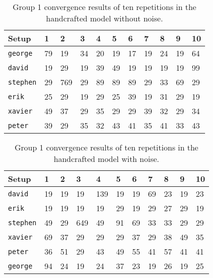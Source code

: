 \begin{table}
	\centering
	\begin{tabular}{lllllllllll}
		\hline
		\textbf{Setup} & \textbf{1} & \textbf{2} & \textbf{3} & \textbf{4} & \textbf{5} & \textbf{6} & \textbf{7} & \textbf{8} & \textbf{9} & \textbf{10} \\\hline
		\texttt{george} & 79 & 19 & 34 & 20 & 19 & 17 & 19 & 24 & 19 & 64 \\
		\texttt{david} & 19 & 29 & 19 & 39 & 49 & 19 & 19 & 19 & 19 & 99 \\
		\texttt{stephen} & 29 & 769 & 29 & 89 & 89 & 89 & 29 & 33 & 69 & 29 \\
		\texttt{erik} & 25 & 29 & 19 & 29 & 25 & 39 & 19 & 31 & 29 & 19 \\
		\texttt{xavier} & 49 & 37 & 29 & 35 & 29 & 29 & 39 & 32 & 29 & 34 \\
		\texttt{peter} & 39 & 29 & 35 & 32 & 43 & 41 & 35 & 41 & 33 & 43 \\
	\end{tabular}
	\caption{Group 1 convergence results of ten repetitions in the handcrafted
	model without noise.}
	\label{tab:apx_conv_group1}
\end{table}
\begin{table}
	\centering
	\begin{tabular}{lllllllllll}
		\hline
		\textbf{Setup} & \textbf{1} & \textbf{2} & \textbf{3} & \textbf{4} & \textbf{5} & \textbf{6} & \textbf{7} & \textbf{8} & \textbf{9} & \textbf{10} \\\hline
		\texttt{david} & 19 & 19 & 19 & 139 & 19 & 19 & 69 & 23 & 19 & 23 \\
		\texttt{erik} & 19 & 19 & 19 & 19 & 29 & 19 & 29 & 27 & 29 & 19 \\
		\texttt{stephen} & 49 & 29 & 649 & 49 & 91 & 69 & 33 & 33 & 29 & 29 \\
		\texttt{xavier} & 69 & 37 & 29 & 29 & 29 & 37 & 29 & 38 & 49 & 35 \\
		\texttt{peter} & 36 & 51 & 29 & 43 & 49 & 55 & 41 & 57 & 41 & 41 \\
		\texttt{george} & 94 & 24 & 19 & 24 & 37 & 23 & 19 & 26 & 19 & 25 \\
	\end{tabular}
	\caption{Group 1 convergence results of ten repetitions in the handcrafted
	model with noise.}
	\label{tab:apx_conv_group1_noise}
\end{table}
